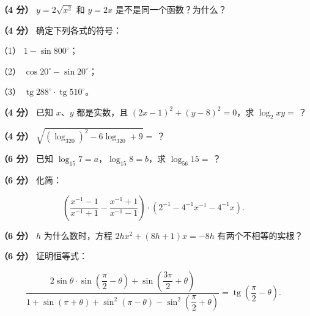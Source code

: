 \begin{question}
\textbf{（4 分）} $y=2\sqrt{x^2}$ 和 $y=2x$ 是不是同一个函数？为什么？

\end{question}
\begin{question}
\textbf{（4 分）} 确定下列各式的符号：

（1） $1-\sin800^\circ$；

（2） $\cos20^\circ-\sin20^\circ$；

（3） $\operatorname{tg}288^\circ\cdot\operatorname{tg}510^\circ$。

\end{question}
\begin{question}
\textbf{（4 分）} 已知 $x$、$y$ 都是实数，且 $(2x-1)^2+(y-8)^2=0$，求 $\log_2xy=\ \text{？}$

\end{question}
\begin{question}
\textbf{（4 分）} $\sqrt{(\log_320)^2-6\log_320+9}=\ \text{？}$

\end{question}
\begin{question}
\textbf{（6 分）} 已知 $\log_{15}7=a$，$\log_{15}8=b$，求 $\log_{56}15=\ \text{？}$

\end{question}
\begin{question}
\textbf{（6 分）} 化简：

\nopagebreak[4]
\[
\left(\frac{x^{-1}-1}{x^{-1}+1}-\frac{x^{-1}+1}{x^{-1}-1}\right)\cdot\left(2^{-1}-4^{-1}x^{-1}-4^{-1}x\right).
\]

\end{question}
\begin{question}
\textbf{（6 分）} $h$ 为什么数时，方程 $2hx^2+(8h+1)x=-8h$ 有两个不相等的实根？

\end{question}
\begin{question}
\textbf{（6 分）} 证明恒等式：

\nopagebreak[4]
\[
\frac{2\sin\theta\cdot\sin\left(\dfrac{\pi}{2}-\theta\right)+\sin\left(\dfrac{3\pi}{2}+\theta\right)}
{1+\sin(\pi+\theta)+\sin^2(\pi-\theta)-\sin^2\left(\dfrac{\pi}{2}+\theta\right)}
=\operatorname{tg}\left(\dfrac{\pi}{2}-\theta\right).
\]

\Needspace{0.4\textheight}
\end{question}

